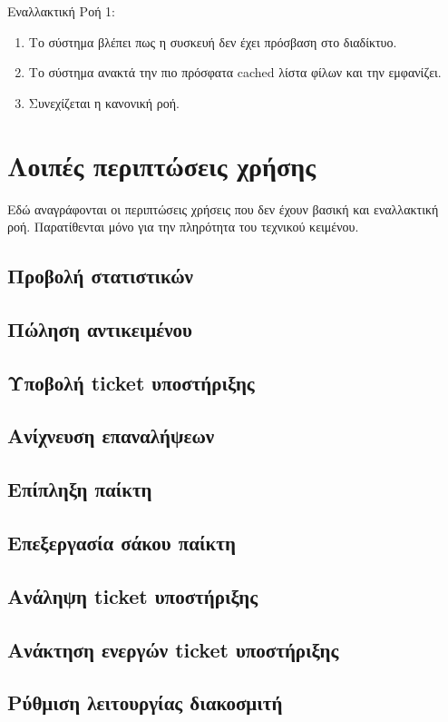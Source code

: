 Εναλλακτική Ροή 1:
\begin{enumerate}[label=2.\alph*.,ref=2.\alph*]
\item Το σύστημα βλέπει πως η συσκευή δεν έχει πρόσβαση στο διαδίκτυο.
\item Το σύστημα ανακτά την πιο πρόσφατα cached λίστα φίλων και την εμφανίζει.
\item Συνεχίζεται η κανονική ροή.
\end{enumerate}

\section{Λοιπές περιπτώσεις χρήσης}
Εδώ αναγράφονται οι περιπτώσεις χρήσεις που δεν έχουν βασική και εναλλακτική ροή. Παρατίθενται μόνο για την πληρότητα του τεχνικού κειμένου.
\subsection{Προβολή στατιστικών}
\subsection{Πώληση αντικειμένου}
\subsection{Υποβολή ticket υποστήριξης}
\subsection{Ανίχνευση επαναλήψεων}
\subsection{Επίπληξη παίκτη}
\subsection{Επεξεργασία σάκου παίκτη}
\subsection{Ανάληψη ticket υποστήριξης}
\subsection{Ανάκτηση ενεργών ticket υποστήριξης}
\subsection{Ρύθμιση λειτουργίας διακοσμιτή}